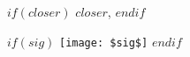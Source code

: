 \begin{flushright}
$if(closer)$
$closer$,
$endif$
\end{flushright}
\begin{flushright}
$if(sig)$
\texttt{[image: \$sig\$]}
$endif$
\end{flushright}
